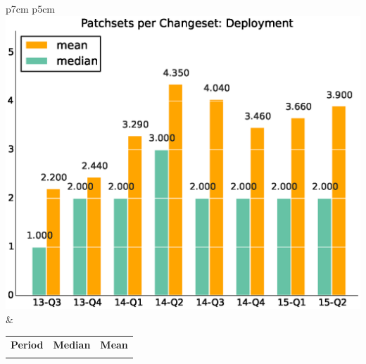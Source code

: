 \documentclass[a4wide,11pt]{article}
\begin{document}
\begin{tabular}{p{7cm} p{5cm}}
    \vspace{0pt} 
    \includegraphics[scale=.35]{figs/patchsets_avgDeployment.eps}
    & 
    \vspace{0pt}
    \begin{tabular}{l|r|r|}%
    \bfseries Period & \bfseries Median & \bfseries Mean %
    \csvreader[head to column names]{data/scr_patchsets_iterationsDeployment.csv}{}%
    {\\ & \medianpatchsets & \meanpatchsets}
    \end{tabular}
\end{tabular}
\end{document}
